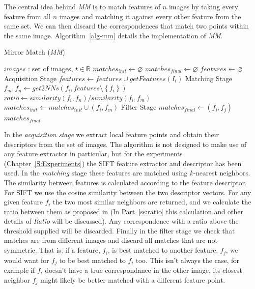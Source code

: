 The central idea behind \emph{MM} is to match features of $n$ images by 
taking every feature from all $n$ images and matching it against every 
other feature from the same set. We can then discard the correspondences 
that match two points within the same image. Algorithm~\ref{alg-mm} 
details the implementation of \emph{MM}.

\begin{algorithm}[htb]
\caption{Mirror Match (\emph{MM})}
\label{alg-mm}
\begin{algorithmic}
\Require $images$ : set of images, $t \in \mathbb{R}$
\State $matches_{init}\gets \varnothing$
\State $matches_{final}\gets \varnothing$
\State $features\gets \varnothing$
 \Comment Acquisition Stage
	\State $features\gets features \cup getFeatures(I_i)$
\EndFor
{} \Comment Matching Stage
	\State $f_m,f_n \gets get2NNs(f_i, features \setminus 
	\left\{f_i\right\})$
	\State $ratio \gets similarity(f_i, f_n) / similarity(f_i, f_m)$
		\State $matches_{init} \gets matches_{init} \cup \left(f_i, f_m\right)$
	\EndIf
\EndFor
{} \Comment Filter 
Stage
		\State $matches_{final} \gets (f_i, f_j)$
	\EndIf
\EndFor \\
\Return $matches_{final}$
\end{algorithmic}
\end{algorithm}

In the \emph{acquisition stage} we extract local feature points and 
obtain their descriptors from the set of images. The algorithm is not 
designed to make use of any feature extractor in particular, but for the
experiments (Chapter~\ref{S:Experiments}) the SIFT feature extractor and
descriptor has been used. In the \emph{matching} stage these features 
are matched using $k$-nearest neighbors.  The similarity between 
features is calculated according to the feature descriptor. For SIFT we 
use the cosine similarity between the two descriptor vectors.  For any 
given feature $f_i$ the two most similar neighbors are returned, and we 
calculate the ratio between them as proposed in \cite{lowe2004sift} (In 
Part~\ref{ss:ratio} this calculation and other details of \emph{Ratio} 
will be discussed).  Any correspondence with a ratio above the threshold 
supplied will be discarded. Finally in the filter stage we check that 
matches are from different images and discard all matches that are not 
symmetric. That is; if a feature, $f_i$, is best matched to another 
feature, $f_j$, we would want for $f_j$ to be best matched to $f_i$ too.
This isn't always the case, for example if $f_i$ doesn't have a true 
correspondance in the other image, its closest neighbor $f_j$ might 
likely be better matched with a different feature point.

